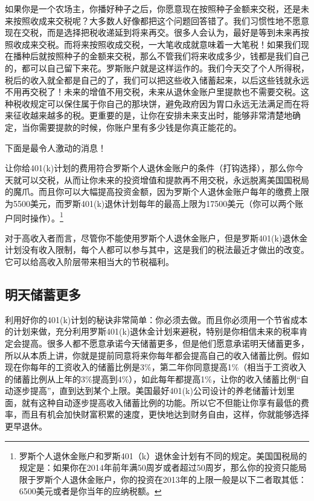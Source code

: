 如果你是一个农场主，你播好种子之后，你愿意现在按照种子金额来交税，还是未来按照收成来交税呢？大多数人好像都把这个问题回答错了。我们习惯性地不愿意现在交税，而是选择把税收递延到将来再交。很多人会认为，最好是等到未来再按照收成来交税。而将来按照收成交税，一大笔收成就意味着一大笔税！如果我们现在播种后就按照种子的金额来交税，那么不管我们将来收成多少，钱都是我们自己的，都可以自己留下来花。罗斯账户就是这样运作的。我们今天交了个人所得税，税后的收入就全都是自己的了，我们可以把这些收入储蓄起来，以后这些钱就永远不用再交税了！未来的增值不用交税，未来从退休金账户里提款也不需要交税。这种税收规定可以保住属于你自己的那块饼，避免政府因为胃口永远无法满足而在将来征收越来越多的税。更重要的是，让你在安排未来支出时，能够非常清楚地确定，当你需要提款的时候，你账户里有多少钱是你真正能花的。

下面是最令人激动的消息！

让你给401(k)计划的费用符合罗斯个人退休金账户的条件（打钩选择），那么你今天就可以交税，从而让你未来的投资增值和提款再不用交税，永远脱离美国国税局的魔爪。而且你可以大幅提高投资金额，因为罗斯个人退休金账户每年的缴费上限为5500美元，而罗斯401(k)退休计划每年的最高上限为17500美元（你可以两个账户同时操作）。\footnote{\label{fn:pdf-10-1}罗斯个人退休金账户和罗斯401（k）退休金计划有不同的规定。美国国税局的规定是：如果你在2014年前年满50周岁或者超过50周岁，那么你的投资只能局限于罗斯个人退休金账户，你的投资在2013年的上限一般是以下二者取其低：6500美元或者是你当年的应纳税额。}

对于高收入者而言，尽管你不能使用罗斯个人退休金账户，但是罗斯401(k)退休金计划没有收入限制，每个人都可以参与其中，这是我们的税法最近才做出的改变。它可以给高收入阶层带来相当大的节税福利。

\subsection{明天储蓄更多}

利用好你的401(k)计划的秘诀非常简单：你必须去做。而且你必须用一个节省成本的计划来做，充分利用罗斯401(k)退休金计划来避税，特别是你相信未来的税率肯定会提高。很多人都不愿意承诺今天储蓄更多，但是他们愿意承诺明天储蓄更多，所以从本质上讲，你就是提前同意将来你每年都会提高自己的收入储蓄比例。假如现在你每年的工资收入的储蓄比例是3\%，第二年你同意提高1\%（相当于工资收入的储蓄比例从上年的3\%提高到4\%），如此每年都提高1\%，让你的收入储蓄比例“自动逐步提高”，直到达到某个上限。美国最好401(k)公司设计的养老储蓄计划里面，就有这种自动逐步提高收入储蓄比例的功能。所以它不但能让你享有最低的费率，而且有机会加快财富积累的速度，更快地达到财务自由，这样，你就能够选择更早退休。


